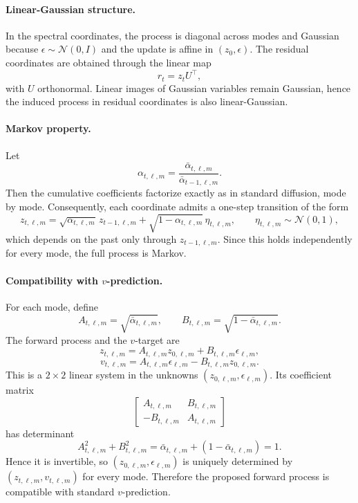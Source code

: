 \documentclass[runningheads]{llncs}
\begin{document}
\paragraph{Linear-Gaussian structure.}
In the spectral coordinates, the process is diagonal across modes and Gaussian because $\epsilon\sim\mathcal{N}(0,I)$ and the update is affine in $(z_0,\epsilon)$. The residual coordinates are obtained through the linear map
\[
r_t = z_t U^\top,
\]
with $U$ orthonormal. Linear images of Gaussian variables remain Gaussian, hence the induced process in residual coordinates is also linear-Gaussian.

\paragraph{Markov property.}
Let
\[
\alpha_{t,\ell,m}
=
\frac{\bar{\alpha}_{t,\ell,m}}{\bar{\alpha}_{t-1,\ell,m}}.
\]
Then the cumulative coefficients factorize exactly as in standard diffusion, mode by mode. Consequently, each coordinate admits a one-step transition of the form
\[
z_{t,\ell,m}
=
\sqrt{\alpha_{t,\ell,m}}\,z_{t-1,\ell,m}
+
\sqrt{1-\alpha_{t,\ell,m}}\,\eta_{t,\ell,m},
\qquad
\eta_{t,\ell,m}\sim\mathcal{N}(0,1),
\]
which depends on the past only through $z_{t-1,\ell,m}$. Since this holds independently for every mode, the full process is Markov.

\paragraph{Compatibility with $v$-prediction.}
For each mode, define
\[
A_{t,\ell,m}=\sqrt{\bar{\alpha}_{t,\ell,m}},
\qquad
B_{t,\ell,m}=\sqrt{1-\bar{\alpha}_{t,\ell,m}}.
\]
The forward process and the $v$-target are
\[
z_{t,\ell,m}=A_{t,\ell,m}z_{0,\ell,m}+B_{t,\ell,m}\epsilon_{\ell,m},
\]
\[
v_{t,\ell,m}=A_{t,\ell,m}\epsilon_{\ell,m}-B_{t,\ell,m}z_{0,\ell,m}.
\]
This is a $2\times2$ linear system in the unknowns $(z_{0,\ell,m},\epsilon_{\ell,m})$. Its coefficient matrix
\[
\begin{bmatrix}
A_{t,\ell,m} & B_{t,\ell,m}\\
-B_{t,\ell,m} & A_{t,\ell,m}
\end{bmatrix}
\]
has determinant
\[
A_{t,\ell,m}^2+B_{t,\ell,m}^2
=
\bar{\alpha}_{t,\ell,m} + (1-\bar{\alpha}_{t,\ell,m})
=
1.
\]
Hence it is invertible, so $(z_{0,\ell,m},\epsilon_{\ell,m})$ is uniquely determined by $(z_{t,\ell,m},v_{t,\ell,m})$ for every mode. Therefore the proposed forward process is compatible with standard $v$-prediction.
\end{document}
